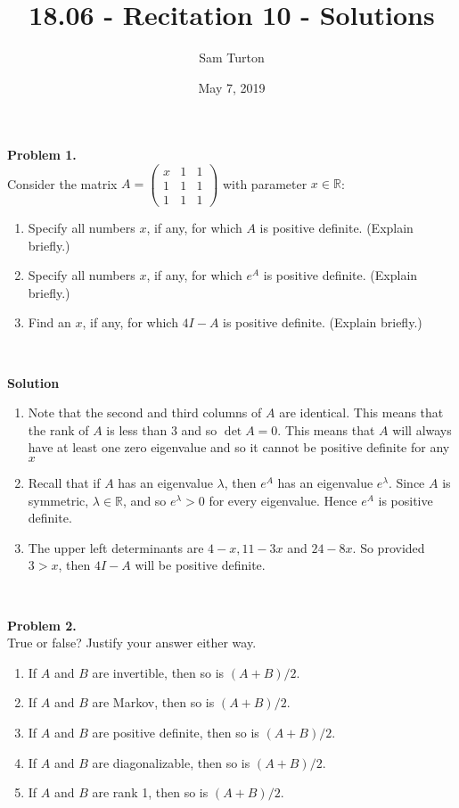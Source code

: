 \documentclass[11pt]{article}
\title{18.06 - Recitation 10 - Solutions}
\author{Sam Turton}
\date{May 7, 2019}
\begin{document}
\maketitle

\noindent \textbf{Problem 1.}\\
Consider the matrix $A = \begin{pmatrix} x & 1 & 1 \\ 1 & 1 & 1 \\ 1 & 1 & 1 \end{pmatrix}$ with parameter $x\in\mathbb{R}$:
\begin{enumerate}
\item Specify all numbers $x$, if any, for which $A$ is positive definite. (Explain briefly.)
\item Specify all numbers $x$, if any, for which $e^A$ is positive definite. (Explain briefly.)
\item Find an $x$, if any, for which $4I - A$ is positive definite. (Explain briefly.)
\end{enumerate}

\

\noindent \textbf{Solution}\\
\begin{enumerate}
\item Note that the second and third columns of $A$ are identical. This means that the rank of $A$ is less than 3 and so $\det A =0$. This means that $A$ will always have at least one zero eigenvalue and so it cannot be positive  definite for any $x$
\item Recall that if $A$ has an eigenvalue $\lambda$, then $e^A$ has an eigenvalue $e^{\lambda}$. Since $A$ is symmetric, $\lambda \in \mathbb{R}$, and so $e^{\lambda} > 0$ for every eigenvalue. Hence $e^A$ is positive definite.
\item The upper left determinants are $4-x, 11 - 3x$ and $24 - 8x$. So provided $3>x$, then $4I - A$ will be positive definite.
\end{enumerate}

\

\noindent \textbf{Problem 2.}\\
True or false? Justify your answer either way.
\begin{enumerate}
\item If $A$ and $B$ are invertible, then so is $(A+B)/2$.
\item If $A$ and $B$ are Markov, then so is $(A+B)/2$.
\item If $A$ and $B$ are positive definite, then so is $(A+B)/2$.
\item If $A$ and $B$ are diagonalizable, then so is $(A+B)/2$.
\item If $A$ and $B$ are rank 1, then so is $(A+B)/2$.
\end{enumerate}
\end{document}
